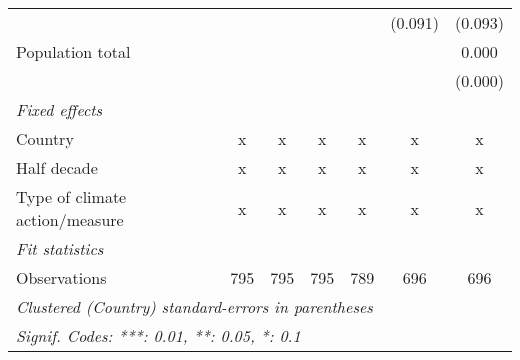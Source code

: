 \begin{tabular}{lcccccc}
                                                   &         &         &         &         & (0.091) & (0.093)\\   
   Population total                                &         &         &         &         &         & 0.000\\   
                                                   &         &         &         &         &         & (0.000)\\   
   \emph{Fixed effects}\\
   Country                                         & x       & x       & x       & x       & x       & x\\  
   Half decade                                     & x       & x       & x       & x       & x       & x\\  
   Type of climate action/measure                  & x       & x       & x       & x       & x       & x\\  
   \midrule \emph{Fit statistics}\\
   Observations                                    & 795     & 795     & 795     & 789     & 696     & 696\\  
   \midrule
   \multicolumn{7}{l}{\emph{Clustered (Country) standard-errors in parentheses}}\\
   \multicolumn{7}{l}{\emph{Signif. Codes: ***: 0.01, **: 0.05, *: 0.1}}\\
\end{tabular}
\par\endgroup


